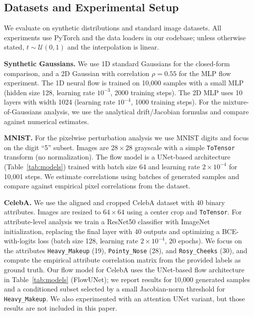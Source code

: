 \subsection{Datasets and Experimental Setup}
\label{subsec:datasets}
We evaluate on synthetic distributions and standard image datasets. All experiments use PyTorch and the data loaders in our codebase; unless otherwise stated, $t \sim \mathcal{U}(0,1)$ and the interpolation is linear.

\textbf{Synthetic Gaussians.} We use 1D standard Gaussians for the closed-form comparison, and a 2D Gaussian with correlation $\rho=0.55$ for the MLP flow experiment. The 1D neural flow is trained on 10{,}000 samples with a small MLP (hidden size 128, learning rate $10^{-3}$, 2000 training steps). The 2D MLP uses 10 layers with width 1024 (learning rate $10^{-4}$, 1000 training steps). For the mixture-of-Gaussians analysis, we use the analytical drift/Jacobian formulas and compare against numerical estimates.

\textbf{MNIST.} For the pixelwise perturbation analysis we use MNIST digits and focus on the digit ``5'' subset. Images are $28\times 28$ grayscale with a simple \texttt{ToTensor} transform (no normalization). The flow model is a UNet-based architecture (Table~\ref{tab:models}) trained with batch size 64 and learning rate $2\times10^{-4}$ for 10{,}001 steps. We estimate correlations using batches of generated samples and compare against empirical pixel correlations from the dataset.

\textbf{CelebA.} We use the aligned and cropped CelebA dataset with 40 binary attributes. Images are resized to $64\times64$ using a center crop and \texttt{ToTensor}. For attribute-level analysis we train a ResNet50 classifier with ImageNet initialization, replacing the final layer with 40 outputs and optimizing a BCE-with-logits loss (batch size 128, learning rate $2\times10^{-4}$, 20 epochs). We focus on the attributes \texttt{Heavy\_Makeup} (19), \texttt{Pointy\_Nose} (28), and \texttt{Rosy\_Cheeks} (30), and compute the empirical attribute correlation matrix from the provided labels as ground truth. Our flow model for CelebA uses the UNet-based flow architecture in Table~\ref{tab:models} (FlowUNet); we report results for 10{,}000 generated samples and a conditioned subset selected by a small Jacobian-norm threshold for \texttt{Heavy\_Makeup}. We also experimented with an attention UNet variant, but those results are not included in this paper.

